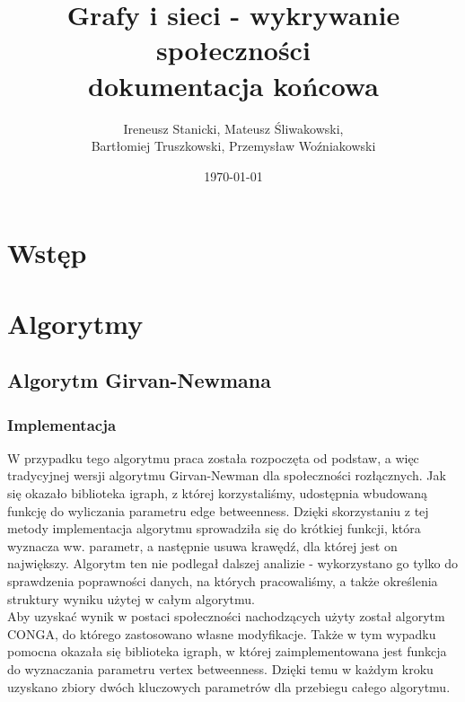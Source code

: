 \documentclass{article}
\title{Grafy i sieci - wykrywanie społeczności\\dokumentacja końcowa}
\date{\today}
\author{Ireneusz Stanicki, Mateusz Śliwakowski,\\Bartłomiej Truszkowski, Przemysław Woźniakowski}
\begin{document}
	\begin{titlingpage}
		\maketitle
	\end{titlingpage}

\tableofcontents
\newpage

\section{Wstęp}

\section{Algorytmy}

\subsection{Algorytm Girvan-Newmana}
\subsubsection{Implementacja}

W przypadku tego algorytmu praca została rozpoczęta od podstaw, a więc tradycyjnej wersji algorytmu Girvan-Newman dla społeczności rozłącznych. Jak się okazało biblioteka igraph, z której korzystaliśmy, udostępnia wbudowaną funkcję do wyliczania parametru edge betweenness. Dzięki skorzystaniu z tej metody implementacja algorytmu sprowadziła się do krótkiej funkcji, która wyznacza ww. parametr, a następnie usuwa krawędź, dla której jest on największy. Algorytm ten nie podlegał dalszej analizie - wykorzystano go tylko do sprawdzenia poprawności danych, na których pracowaliśmy, a także określenia struktury wyniku użytej w całym algorytmu.\\

Aby uzyskać wynik w postaci społeczności nachodzących użyty został algorytm CONGA, do którego zastosowano własne modyfikacje. Także w tym wypadku pomocna okazała się biblioteka igraph, w której zaimplementowana jest funkcja do wyznaczania parametru vertex betweenness. Dzięki temu w każdym kroku uzyskano zbiory dwóch kluczowych parametrów dla przebiegu całego algorytmu.\\
\end{document}
